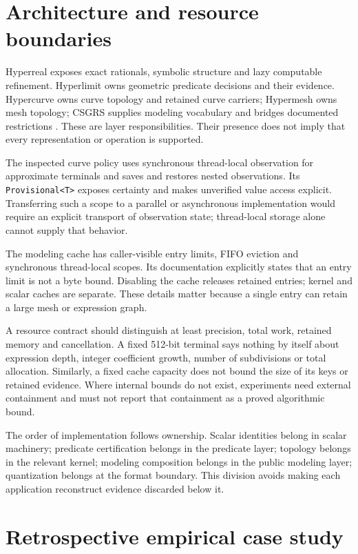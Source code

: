 \documentclass[11pt]{article}
\begin{document}
\section{Architecture and resource boundaries}
Hyperreal exposes exact rationals, symbolic structure and lazy computable
refinement. Hyperlimit owns geometric predicate decisions and their evidence.
Hypercurve owns curve topology and retained curve carriers; Hypermesh owns mesh
topology; CSGRS supplies modeling vocabulary and bridges documented restrictions
\cite{contract,implementation}. These are layer responsibilities. Their presence
does not imply that every representation or operation is supported.

The inspected curve policy uses synchronous thread-local observation for
approximate terminals and saves and restores nested observations.
Its \texttt{Provisional<T>} exposes certainty and makes unverified value access
explicit. Transferring such a scope to a parallel or asynchronous implementation
would require an explicit transport of observation state; thread-local storage
alone cannot supply that behavior.

The modeling cache has caller-visible entry limits, FIFO eviction and
synchronous thread-local scopes. Its documentation explicitly states that an
entry limit is not a byte bound. Disabling the cache releases retained entries;
kernel and scalar caches are separate. These details matter because a single
entry can retain a large mesh or expression graph.

A resource contract should distinguish at least precision, total work, retained
memory and cancellation. A fixed 512-bit terminal says nothing by itself about
expression depth, integer coefficient growth, number of subdivisions or total
allocation. Similarly, a fixed cache capacity does not bound the size of its
keys or retained evidence. Where internal bounds do not exist, experiments
need external containment and must not report that containment as a proved
algorithmic bound.

The order of implementation follows ownership. Scalar identities belong in
scalar machinery; predicate certification belongs in the predicate layer;
topology belongs in the relevant kernel; modeling composition belongs in the
public modeling layer; quantization belongs at the format boundary. This
division avoids making each application reconstruct evidence discarded below it.

\section{Retrospective empirical case study}
\end{document}
